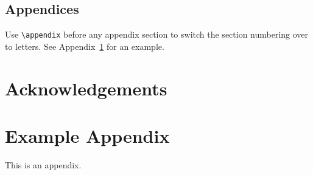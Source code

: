 \documentclass[11pt]{article}
\begin{document}
\subsection{Appendices}

Use \verb|\appendix| before any appendix section to switch the section numbering over to letters. See Appendix~\ref{sec:appendix} for an example.

\section*{Acknowledgements}



\appendix

\section{Example Appendix}
\label{sec:appendix}

This is an appendix.
\end{document}
